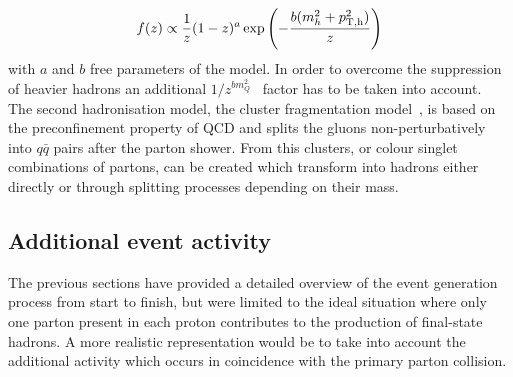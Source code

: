 \begin{equation}
 f(z) \propto \frac{1}{z} (1-z)^{a} \exp \left( - \frac{b(m_{h}^{2} + p_{\rm T,h}^{2})}{z} \right)
\end{equation}
with $a$ and $b$ free parameters of the model.
In order to overcome the suppression of heavier hadrons an additional $1/z^{bm_{Q}^{2}}$~\cite{Skands:2011pf} factor has to be taken into account.
\\
The second hadronisation model, the cluster fragmentation model~\cite{Hoche:2014rga}, is based on the preconfinement property of QCD and splits the gluons non-perturbatively into $q\bar{q}$ pairs after the parton shower. From this clusters, or colour singlet combinations of partons, can be created which transform into hadrons either directly or through splitting processes depending on their mass. 

\subsection{Additional event activity}%

The previous sections have provided a detailed overview of the event generation process from start to finish, but were limited to the ideal situation where only one parton present in each proton contributes to the production of final-state hadrons. A more realistic representation would be to take into account the additional activity which occurs in coincidence with the primary parton collision. 
\\

